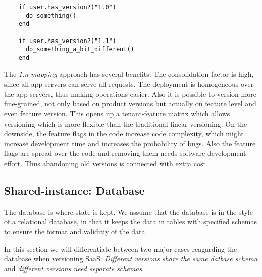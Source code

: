 \noindent\begin{minipage}{\textwidth}
  \begin{lstlisting}
    if user.has_version?("1.0")
      do_something()
    end

    if user.has_version?("1.1")
      do_something_a_bit_different()
    end
  \end{lstlisting}
\end{minipage}

The \emph{1:n mapping} approach has several benefits: The consolidation factor is high, since all app servers can serve all requests. The deployment is homogeneous over the app servers, thus making operations easier. Also it is possible to version more fine-grained, not only based on product versions but actually on feature level and even feature version. This opens up a tenant-feature matrix which allows versioning which is more flexible than the traditional linear versioning.
On the downside, the feature flags in the code increase code complexity, which might increase development time and increases the probability of bugs. Also the feature flags are spread over the code and removing them needs software development effort. Thus abandoning old versions is connected with extra cost.

%
%
%

\subsection{Shared-instance: Database}
\label{sec:database}

The database is where state is kept. We assume that the database is in the style of a relational database, in that it keeps the data in tables with specified schemas to ensure the format and validitiy of the data.

In this section we will differentiate between two major cases reagarding the database when versioning SaaS: \emph{Different versions share the same datbase schema} and \emph{different versions need separate schemas}.

